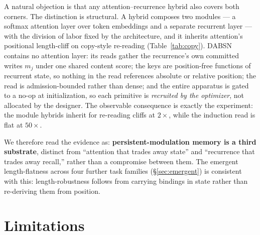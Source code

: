 \documentclass[11pt]{article}
\newcommand{\model}{DABSN}
\begin{document}
A natural objection is that any attention--recurrence hybrid
\citep{de2024griffin,lieber2024jamba} also covers both corners. The
distinction is structural. A hybrid composes two modules --- a softmax
attention layer over token embeddings and a separate recurrent layer --- with
the division of labor fixed by the architecture, and it inherits attention's
positional length-cliff on copy-style re-reading (Table~\ref{tab:copy}).
\model{} contains no attention layer: its reads gather the recurrence's own
committed writes $m_j$ under one shared content score; the keys are
position-free functions of recurrent state, so nothing in the read references
absolute or relative position; the read is admission-bounded rather than
dense; and the entire apparatus is gated to a no-op at initialization, so
each primitive is \emph{recruited by the optimizer}, not allocated by the
designer. The observable consequence is exactly the experiment: the module
hybrids inherit for re-reading cliffs at $2\times$, while the induction read
is flat at $50\times$.

We therefore read the evidence as: \textbf{persistent-modulation memory is a
third substrate}, distinct from ``attention that trades away state'' and
``recurrence that trades away recall,'' rather than a compromise between
them. The emergent length-flatness across four further task families
(\S\ref{sec:emergent}) is consistent with this: length-robustness follows
from carrying bindings in state rather than re-deriving them from position.

\section{Limitations}
\label{sec:limitations}
\end{document}
